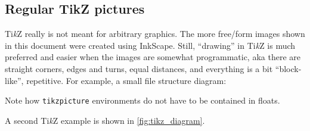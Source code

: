 \subsection{Regular TikZ pictures}

Ti\textit{k}Z really is not meant for arbitrary graphics.
The more free\-/form images shown in this document were created using InkScape.
Still, \enquote{drawing} in Ti\textit{k}Z is much preferred and easier when the
images are somewhat programmatic, aka there are straight corners, edges and turns,
equal distances, and everything is a bit \enquote{block-like}, repetitive.
For example, a small file structure diagram:
\begin{center}
\end{center}
Note how \verb|tikzpicture| environments do not have to be contained in floats.

A second Ti\textit{k}Z example is shown in \cref{fig:tikz_diagram}.


